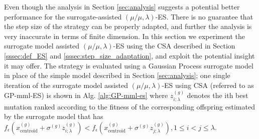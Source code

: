 		



Even though the analysis in Section \ref{sec:analysis} suggests a potential better performance for the surrogate-assisted $(\mu/\mu,\lambda)$-ES. There is no guarantee that the step size of the strategy can be properly adapted, and further the analysis is very inaccurate in terms of finite dimension. In this section we experiment the surrogate model assisted $(\mu/\mu,\lambda)$-ES using the CSA described in Section \ref{sssec:def_ES} and \ref{sssec:step_size_adaptation}, and exploit the potential insight it may offer. The strategy is evaluated using a Gaussian Process surrogate model in place of the simple model described in Section \ref{sec:analysis}; one single iteration of the surrogate model assisted $(\mu/\mu,\lambda)$-ES using CSA (referred to as GP-mml-ES) is shown in Alg. \ref{alg:GP-mml-es} where $z_{i;\lambda}^{(g)}$ denotes the ith best mutation ranked according to the fitness of the corresponding offspring estimated by the surrogate model that has $f_{\epsilon}(x_{\text{centroid}}^{(g)} + \sigma^{(g)} z_{i;\lambda}^{(g)})<f_{\epsilon}(x_{\text{centroid}}^{(g)} + \sigma^{(g)} z_{j;\lambda}^{(g)}),1 \leq i < j \leq \lambda$. 

